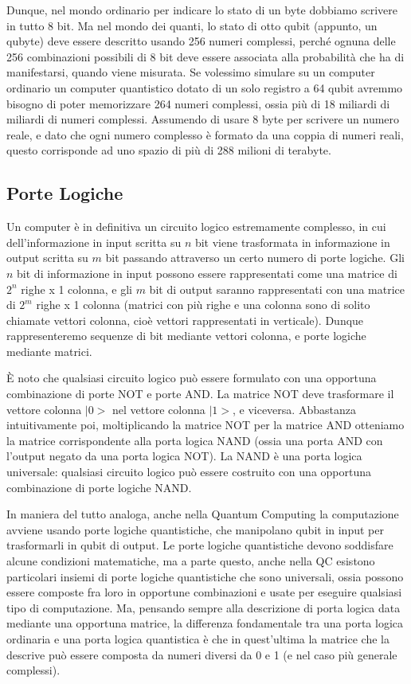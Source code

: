 Dunque, nel mondo ordinario per indicare lo stato di un byte
dobbiamo scrivere in tutto 8 bit. Ma nel mondo dei quanti, lo stato di
otto qubit (appunto, un qubyte) deve essere descritto usando 256
numeri complessi, perché ognuna delle 256 combinazioni possibili
di 8 bit deve essere associata alla probabilità che ha di
manifestarsi, quando viene misurata. Se volessimo simulare su un computer ordinario un
computer quantistico dotato di un solo registro a 64 qubit avremmo
bisogno di poter memorizzare 264 numeri complessi, ossia più di 18
miliardi di miliardi di numeri complessi.
Assumendo di usare 8 byte per scrivere un numero reale, e dato che
ogni numero complesso è formato da una coppia di numeri reali,
questo corrisponde ad uno spazio di più di 288 milioni di terabyte.

\subsection{Porte Logiche}

Un computer è in definitiva un circuito logico estremamente
complesso, in cui dell’informazione in input scritta su $n$ bit viene
trasformata in informazione in output scritta su $m$ bit passando
attraverso un certo numero di porte logiche.
Gli $n$ bit di informazione in input possono essere rappresentati come una matrice di $2^n$ righe x 1 colonna, e gli $m$ bit di output saranno rappresentati con una matrice di
$2^m$ righe x 1 colonna (matrici con più righe e una colonna sono di
solito chiamate vettori colonna, cioè vettori rappresentati in verticale). Dunque rappresenteremo sequenze di bit mediante vettori colonna, e porte logiche mediante matrici.

È noto che qualsiasi circuito logico può essere formulato con una
opportuna combinazione di porte NOT e porte AND. La matrice NOT deve trasformare il vettore colonna $|0>$ nel vettore colonna $|1>$, e viceversa. Abbastanza intuitivamente poi, moltiplicando la matrice NOT per la matrice AND otteniamo la matrice corrispondente alla porta logica
NAND (ossia una porta AND con l’output negato da una porta logica NOT). La NAND è una porta logica universale: qualsiasi circuito logico
può essere costruito con una opportuna combinazione di porte logiche
NAND.

In maniera del tutto analoga, anche nella Quantum Computing la
computazione avviene usando porte logiche quantistiche, che
manipolano qubit in input per trasformarli in qubit di output. Le porte logiche quantistiche devono soddisfare alcune condizioni matematiche, ma a
parte questo, anche nella QC esistono particolari insiemi di porte
logiche quantistiche che sono universali, ossia possono essere
composte fra loro in opportune combinazioni e usate per eseguire
qualsiasi tipo di computazione.
Ma, pensando sempre alla descrizione di porta logica data mediante
una opportuna matrice, la differenza fondamentale tra una porta logica
ordinaria e una porta logica quantistica è che in quest’ultima la
matrice che la descrive può essere composta da numeri diversi da 0 e
1 (e nel caso più generale complessi).

